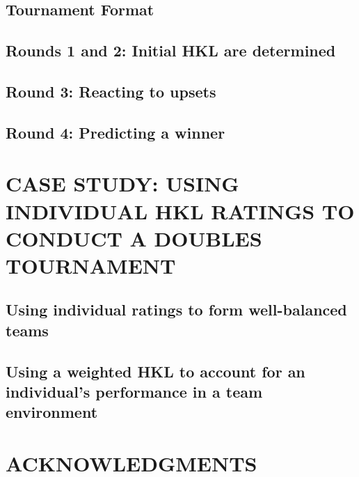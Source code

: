 \documentclass[letterpaper, 10 pt, conference]{ieeeconf}  %
\begin{document}
\subsection{Tournament Format}

\subsection{Rounds 1 and 2: Initial HKL are determined}

\subsection{Round 3: Reacting to upsets}

\subsection{Round 4: Predicting a winner}

\section{CASE STUDY: USING INDIVIDUAL HKL RATINGS TO CONDUCT A DOUBLES TOURNAMENT}

\subsection{Using individual ratings to form well-balanced teams}
\subsection{Using a weighted HKL to account for an individual's performance in a team environment} 



\section*{ACKNOWLEDGMENTS}


% 

\end{document}
